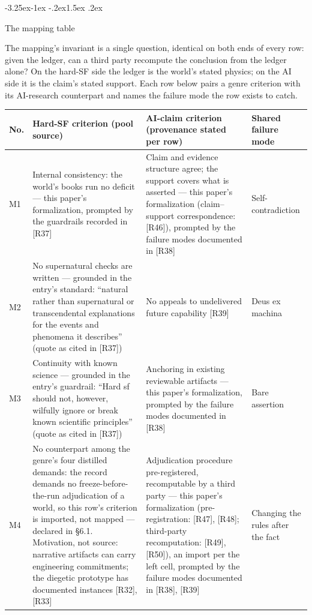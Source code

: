 \documentclass[11pt,a4paper]{article}
\makeatletter
\renewcommand\subsection{\@startsection{subsection}{2}{\z@}%
  {-3.25ex\@plus -1ex \@minus -.2ex}{1.5ex \@plus .2ex}%
  {\normalfont\large\bfseries\raggedright}}
\makeatother
\begin{document}
\subsection{The mapping table}

The mapping's invariant is a single question, identical on both ends of every row: given the ledger, can a third party recompute the conclusion from the ledger alone? On the hard-SF side the ledger is the world's stated physics; on the AI side it is the claim's stated support. Each row below pairs a genre criterion with its AI-research counterpart and names the failure mode the row exists to catch.

\begin{table}[htbp]
\centering
\small
\setlength{\tabcolsep}{3.5pt}
\renewcommand{\arraystretch}{1.18}
\begin{tabularx}{0.985\textwidth}{@{}>{\raggedright\arraybackslash}p{}>{\raggedright\arraybackslash}X>{\raggedright\arraybackslash}X>{\raggedright\arraybackslash}p{}@{}}
\toprule
\textbf{No.} & \textbf{Hard-SF criterion (pool source)} & \textbf{AI-claim criterion (provenance stated per row)} & \textbf{Shared failure mode} \\
\midrule
M1 & Internal consistency: the world's books run no deficit — this paper's formalization, prompted by the guardrails recorded in [R37] & Claim and evidence structure agree; the support covers what is asserted — this paper's formalization (claim–support correspondence: [R46]), prompted by the failure modes documented in [R38] & Self-contradiction \\
M2 & No supernatural checks are written — grounded in the entry's standard: ``natural rather than supernatural or transcendental explanations for the events and phenomena it describes'' (quote as cited in [R37]) & No appeals to undelivered future capability [R39] & Deus ex machina \\
M3 & Continuity with known science — grounded in the entry's guardrail: ``Hard sf should not, however, wilfully ignore or break known scientific principles'' (quote as cited in [R37]) & Anchoring in existing reviewable artifacts — this paper's formalization, prompted by the failure modes documented in [R38] & Bare assertion \\
M4 & No counterpart among the genre's four distilled demands: the record demands no freeze-before-the-run adjudication of a world, so this row's criterion is imported, not mapped — declared in §6.1. Motivation, not source: narrative artifacts can carry engineering commitments; the diegetic prototype has documented instances [R32], [R33] & Adjudication procedure pre-registered, recomputable by a third party — this paper's formalization (pre-registration: [R47], [R48]; third-party recomputation: [R49], [R50]), an import per the left cell, prompted by the failure modes documented in [R38], [R39] & Changing the rules after the fact \\

\end{tabularx}
\end{table}
\end{document}
